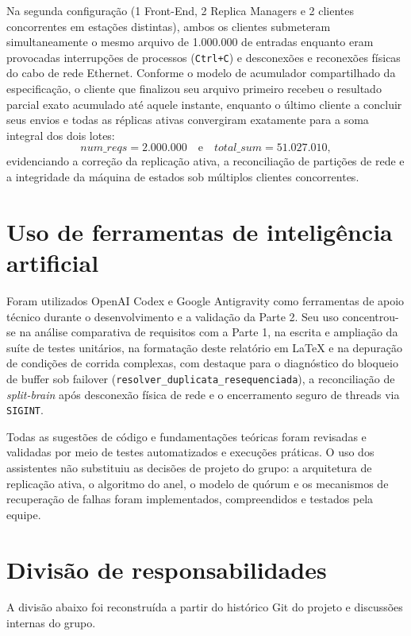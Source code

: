 \documentclass[12pt,a4paper]{article}
\newcommand{\arquivo}[1]{\texttt{#1}}
\begin{document}
Na segunda configuração (1 Front-End, 2 Replica Managers e 2 clientes concorrentes em estações distintas), ambos os clientes submeteram simultaneamente o mesmo arquivo de 1.000.000 de entradas enquanto eram provocadas interrupções de processos (\texttt{Ctrl+C}) e desconexões e reconexões físicas do cabo de rede Ethernet. Conforme o modelo de acumulador compartilhado da especificação, o cliente que finalizou seu arquivo primeiro recebeu o resultado parcial exato acumulado até aquele instante, enquanto o último cliente a concluir seus envios e todas as réplicas ativas convergiram exatamente para a soma integral dos dois lotes:
\[
    num\_reqs = 2.000.000 \quad \text{e} \quad total\_sum = 51.027.010,
\]
evidenciando a correção da replicação ativa, a reconciliação de partições de rede e a integridade da máquina de estados sob múltiplos clientes concorrentes.

\section{Uso de ferramentas de inteligência artificial}

Foram utilizados OpenAI Codex e Google Antigravity como ferramentas de apoio técnico durante o desenvolvimento e a validação da Parte 2. Seu uso
concentrou-se na análise comparativa de requisitos com a Parte 1, na escrita e ampliação da suíte de testes unitários, na formatação deste relatório em LaTeX e na depuração de condições de corrida complexas, com destaque para o diagnóstico do bloqueio de buffer sob failover (\arquivo{resolver\_duplicata\_resequenciada}), a reconciliação de \textit{split-brain} após desconexão física de rede e o encerramento seguro de threads via \texttt{SIGINT}.

Todas as sugestões de código e fundamentações teóricas foram revisadas e validadas por meio de testes automatizados e execuções práticas. O uso dos assistentes não substituiu as decisões de projeto do grupo: a arquitetura de replicação ativa, o algoritmo do anel, o modelo de quórum e os mecanismos de recuperação de falhas foram implementados, compreendidos e testados pela equipe.

\section{Divisão de responsabilidades}

A divisão abaixo foi reconstruída a partir do histórico Git do projeto e discussões internas do grupo.
\end{document}
